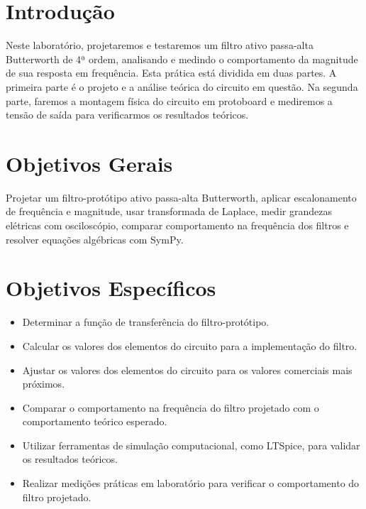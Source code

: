 \documentclass[
	12pt,				%
	openright,			%
	twoside,			%
	a4paper,			%
	english,			%
	french,				%
	spanish,			%
	brazil,				%
	]{abntex2}
\begin{document}

\frenchspacing 


\imprimircapa

\imprimirfolhaderosto*




\textual



\chapter{Introdução}
Neste laboratório, projetaremos e testaremos um filtro ativo passa-alta Butterworth de 4ª ordem, analisando e medindo o comportamento da magnitude de sua resposta em frequência.
Esta prática está dividida em duas partes. A primeira parte é o projeto e a análise teórica do circuito em questão. Na segunda parte, faremos a montagem física do circuito em protoboard e mediremos a tensão de saída para verificarmos os resultados teóricos.


\chapter{Objetivos Gerais}
Projetar um filtro-protótipo ativo passa-alta Butterworth, aplicar escalonamento de frequência e magnitude, usar transformada de Laplace, medir grandezas elétricas com osciloscópio, comparar comportamento na frequência dos filtros e resolver equações algébricas com SymPy.


\chapter{Objetivos Específicos}
\begin{itemize}
    \item Determinar a função de transferência do filtro-protótipo.
    \item Calcular os valores dos elementos do circuito para a implementação do filtro.
    \item Ajustar os valores dos elementos do circuito para os valores comerciais mais próximos.
    \item Comparar o comportamento na frequência do filtro projetado com o comportamento teórico esperado.
    \item Utilizar ferramentas de simulação computacional, como LTSpice, para validar os resultados teóricos.
    \item Realizar medições práticas em laboratório para verificar o comportamento do filtro projetado.
\end{itemize}
\end{document}
